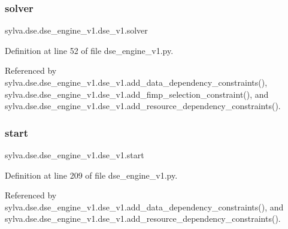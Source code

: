 \subsubsection{\texorpdfstring{solver}{solver}}
{\footnotesize\ttfamily sylva.\+dse.\+dse\+\_\+engine\+\_\+v1.\+dse\+\_\+v1.\+solver}



Definition at line 52 of file dse\+\_\+engine\+\_\+v1.\+py.



Referenced by sylva.\+dse.\+dse\+\_\+engine\+\_\+v1.\+dse\+\_\+v1.\+add\+\_\+data\+\_\+dependency\+\_\+constraints(), sylva.\+dse.\+dse\+\_\+engine\+\_\+v1.\+dse\+\_\+v1.\+add\+\_\+fimp\+\_\+selection\+\_\+constraint(), and sylva.\+dse.\+dse\+\_\+engine\+\_\+v1.\+dse\+\_\+v1.\+add\+\_\+resource\+\_\+dependency\+\_\+constraints().

\mbox{\label{classsylva_1_1dse_1_1dse__engine__v1_1_1dse__v1_abedb3388036f38e634e325bd6a4d6e27}} 
\subsubsection{\texorpdfstring{start}{start}}
{\footnotesize\ttfamily sylva.\+dse.\+dse\+\_\+engine\+\_\+v1.\+dse\+\_\+v1.\+start}



Definition at line 209 of file dse\+\_\+engine\+\_\+v1.\+py.



Referenced by sylva.\+dse.\+dse\+\_\+engine\+\_\+v1.\+dse\+\_\+v1.\+add\+\_\+data\+\_\+dependency\+\_\+constraints(), and sylva.\+dse.\+dse\+\_\+engine\+\_\+v1.\+dse\+\_\+v1.\+add\+\_\+resource\+\_\+dependency\+\_\+constraints().

\mbox{\label{classsylva_1_1dse_1_1dse__engine__v1_1_1dse__v1_a8c776f086963df1ce7224d67075ba86e}} 
